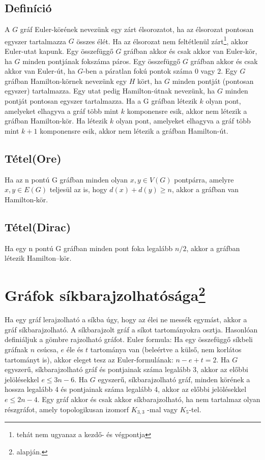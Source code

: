 \documentclass[12pt,a4paper,twoside]{report}
\begin{document}
\subsection{Definíció}
A $G$ gráf Euler-körének nevezünk egy zárt élsorozatot, ha az élsorozat pontosan egyszer tartalmazza $G$ összes élét. Ha az élsorozat nem feltétlenül zárt\footnote{tehát nem ugyanaz a kezdő- és végpontja}, akkor Euler-utat kapunk.
\ttl
Egy összefüggő $G$ gráfban akkor és csak akkor van Euler-kör, ha $G$ minden pontjának fokszáma páros.
\ttl
 Egy összefüggő $G$ gráfban akkor és csak akkor van Euler-út, ha $G$-ben a páratlan fokú pontok száma $0$ vagy $2$.
\df
Egy $G$ gráfban Hamilton-körnek nevezünk egy $H$ kört, ha $G$ minden pontját (pontosan egyszer) tartalmazza. Egy utat pedig Hamilton-útnak nevezünk, ha $G$ minden pontját pontosan egyszer tartalmazza.
\ttl
Ha a G gráfban létezik $k$ olyan pont, amelyeket elhagyva a gráf több mint $k$ komponensre esik, akkor nem létezik a gráfban Hamilton-kör. Ha létezik $k$ olyan pont, amelyeket elhagyva a gráf több mint $k + 1$ komponensre esik, akkor nem létezik a gráfban Hamilton-út.
\subsection{Tétel(Ore)}
Ha az n pontú G gráfban minden olyan $x, y \in V (G)$ pontpárra, amelyre ${x, y} \in E(G)$ teljesül az is, hogy $d(x) + d(y) \geq n$, akkor a gráfban van Hamilton-kör.
\subsection{Tétel(Dirac)}
Ha egy n pontú G gráfban minden pont foka legalább $n/2$, akkor a gráfban létezik Hamilton–kör.
\section{Gráfok síkbarajzolhatósága\protect\footnote{\cite{kv} alapján.}}
\df
Ha egy gráf lerajzolható a síkba úgy, hogy az élei ne messék egymást, akkor a gráf síkbarajzolható. A síkbarajzolt gráf a síkot tartományokra osztja. Hasonlóan definiáljuk a gömbre rajzolható gráfot.
\ttl
Euler formula: Ha egy összefüggő síkbeli gráfnak $n$ csúcsa, $e$ éle és $t$ tartománya van (beleértve a külső, nem korlátos tartományt is), akkor eleget tesz az Euler-formulának: $n-e+t = 2$.
\ttl
Ha $G$ egyszerű, síkbarajzolható gráf és pontjainak száma legalább 3, akkor az előbbi jelölésekkel $e\leq3n-6$.
\ttl
Ha $G$ egyszerű, síkbarajzolható gráf, minden körének a hossza legalább 4 és pontjainak száma legalább 4, akkor az előbbi jelölésekkel $e\leq2n-4$.
\ttl
Egy gráf akkor és csak akkor síkbarajzolható, ha nem tartalmaz olyan részgráfot, amely topologikusan izomorf $K_{3,3}$ -mal vagy $K_5$-tel.
\end{document}
